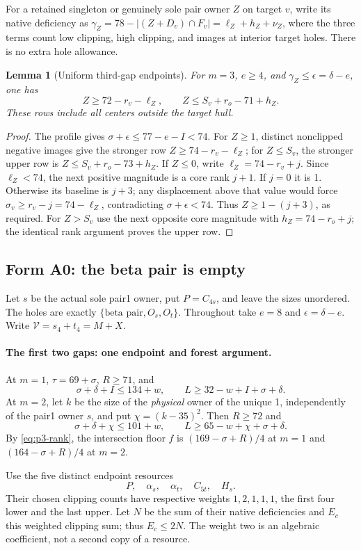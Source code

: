 \documentclass[11pt,letterpaper]{article}
\newtheorem{lemma}[theorem]{Lemma}
\theoremstyle{definition}\newtheorem{definition}[theorem]{Definition}
\begin{document}
For a retained singleton or genuinely sole pair owner $Z$ on target $v$,
write its native deficiency as
$\gamma_Z=78-|(Z+D_v)\cap F_v|=\ell_Z+h_Z+\nu_Z$,
where the three terms count low clipping, high clipping, and images at
interior target holes. There is no extra hole allowance.
\begin{lemma}[Uniform third-gap endpoints]\label{lem:p3-END2}
For $m=3$, $e\ge4$, and $\gamma_Z\le\epsilon=\delta-e$, one has
\[
Z\ge72-r_v-\ell_Z,\qquad Z\le S_v+r_o-71+h_Z.
\]
These rows include all centers outside the target hull.
\end{lemma}
\begin{proof}
The profile gives $\sigma+\epsilon\le77-e-I<74$.
For $Z\ge1$, distinct nonclipped negative images give the stronger row
$Z\ge74-r_v-\ell_Z$; for $Z\le S_v$, the stronger upper row is
$Z\le S_v+r_o-73+h_Z$.
If $Z\le0$, write $\ell_Z=74-r_v+j$. Since $\ell_Z<74$, the next
positive magnitude is a core rank $j+1$. If $j=0$ it is 1. Otherwise
its baseline is $j+3$; any displacement above that value would force
$\sigma_v\ge r_v-j=74-\ell_Z$, contradicting
$\sigma+\epsilon<74$. Thus $Z\ge1-(j+3)$, as required.
For $Z>S_v$ use the next opposite core magnitude with
$h_Z=74-r_o+j$; the identical rank argument proves the upper row.
\end{proof}

\subsection{Form A0: the beta pair is empty}
Let $s$ be the actual sole pair1 owner, put $P=C_{4s}$, and leave the
sizes unordered. The holes are exactly $\{\text{beta pair},O_s,O_t\}$.
Throughout take $e=8$ and $\epsilon=\delta-e$. Write
$\mathcal V=s_4+t_4=M+X$.

\paragraph{The first two gaps: one endpoint and forest argument.}
At $m=1$, $\tau=69+\sigma$, $R\ge71$, and
\[
\sigma+\delta+I\le134+w,\qquad L\ge32-w+I+\sigma+\delta.
\]
At $m=2$, let $k$ be the size of the \emph{physical} owner of the unique
1, independently of the pair1 owner $s$, and put $\chi=(k-35)^2$.
Then $R\ge72$ and
\[
\sigma+\delta+\chi\le101+w,\qquad
L\ge65-w+\chi+\sigma+\delta.
\]
By \eqref{eq:p3-rank}, the intersection floor $f$ is
$(169-\sigma+R)/4$ at $m=1$ and $(164-\sigma+R)/4$ at $m=2$.

Use the five distinct endpoint resources
\[
P,\quad\alpha_s,\quad\alpha_t,\quad C_{5t},\quad H_s.
\]
Their chosen clipping counts have respective weights
$1,2,1,1,1$, the first four lower and the last upper.
Let $N$ be the sum of their native deficiencies and $E_c$ this weighted
clipping sum; thus $E_c\le2N$. The weight two is an algebraic
coefficient, not a second copy of a resource.
\end{document}
